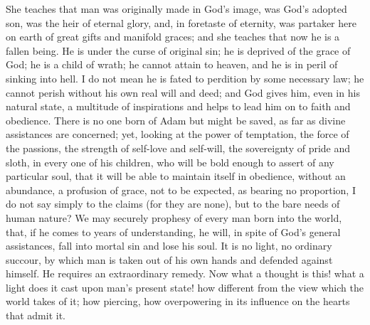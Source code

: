 She teaches that man was originally made in God's image, was God's
adopted son, was the heir of eternal glory, and, in foretaste of
eternity, was partaker here on earth of great gifts and manifold
graces; and she teaches that now he is a fallen being. He is under the
curse of original sin; he is deprived of the grace of God; he is a
child of wrath; he cannot attain to heaven, and he is in peril of
sinking into hell. I do not mean he is fated to perdition by some
necessary law; he cannot perish without his own real will and deed;
and God gives him, even in his natural state, a multitude of
inspirations and helps to lead him on to faith and obedience. There is
no one born of Adam but might be saved, as far as divine assistances
are concerned; yet, looking at the power of temptation, the force of
the passions, the strength of self-love and self-will, the sovereignty
of pride and sloth, in every one of his children, who will be bold
enough to assert of any particular soul, that it will be able to
maintain itself in obedience, without an abundance, a profusion of
grace, not to be expected, as bearing no proportion, I do not say
simply to the claims (for they are none), but to the bare needs of
human nature? We may securely prophesy of every man born into the
world, that, if he comes to years of understanding, he will, in spite
of God's general assistances, fall into mortal sin and lose his soul.
It is no light, no ordinary succour, by which man is taken out of his
own hands and defended against himself. He requires an extraordinary
remedy. Now what a thought is this! what a light does it cast upon
man's present state! how different from the view which the world takes
of it; how piercing, how overpowering in its influence on the hearts
that admit it.

